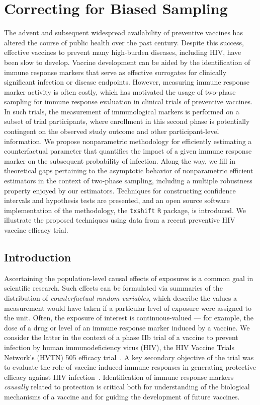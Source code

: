 \chapter{Correcting for Biased Sampling}\label{two}

The advent and subsequent widespread availability of preventive vaccines has
altered the course of public health over the past century. Despite this success,
effective vaccines to prevent many high-burden diseases, including HIV, have
been slow to develop. Vaccine development can be aided by the identification of
immune response markers that serve as effective surrogates for clinically
significant infection or disease endpoints. However, measuring immune response
marker activity is often costly, which has motivated the usage of two-phase
sampling for immune response evaluation in clinical trials of preventive
vaccines. In such trials, the measurement of immunological markers is performed
on a subset of trial participants, where enrollment in this second phase is
potentially contingent on the observed study outcome and other participant-level
information. We propose nonparametric methodology for efficiently estimating
a counterfactual parameter that quantifies the impact of a given immune response
marker on the subsequent probability of infection. Along the way, we fill in
theoretical gaps pertaining to the asymptotic behavior of nonparametric
efficient estimators in the context of two-phase sampling, including a multiple
robustness property enjoyed by our estimators. Techniques for constructing
confidence intervals and hypothesis tests are presented, and an open source
software implementation of the methodology, the \texttt{txshift} \texttt{R}
package, is introduced. We illustrate the proposed techniques using data from
a recent preventive HIV vaccine efficacy trial.

\section{Introduction}\label{intro}

Ascertaining the population-level causal effects of exposures is a common goal
in scientific research. Such effects can be formulated via summaries of the
distribution of \emph{counterfactual random variables}, which describe the
values a measurement would have taken if a particular level of exposure were
assigned to the unit. Often, the exposure of interest is continuous-valued ---
for example, the dose of a drug or level of an immune response marker induced by
a vaccine. We consider the latter in the context of a phase IIb trial of
a vaccine to prevent infection by human immunodeficiency virus (HIV), the HIV
Vaccine Trials Network's (HVTN) 505 efficacy trial~\citep{hammer2013efficacy}.
A key secondary objective of the trial was to evaluate the role of
vaccine-induced immune responses in generating protective efficacy against HIV
infection~\citep{janes2017higher}. Identification of immune response markers
\textit{causally} related to protection is critical both for understanding of
the biological mechanisms of a vaccine and for guiding the development of future
vaccines.

